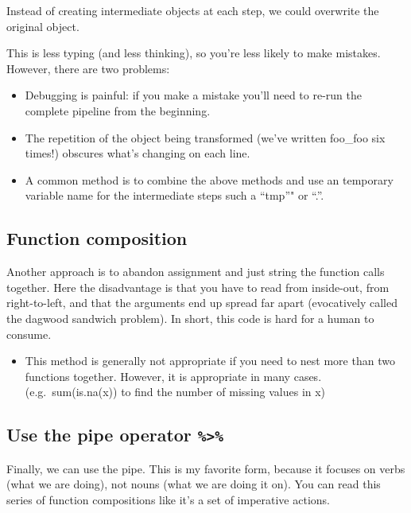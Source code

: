 \documentclass[]{book}
\providecommand{\tightlist}{%
  \setlength{\itemsep}{0pt}\setlength{\parskip}{0pt}}
\newenvironment{rmdblock}[1]
  {\begin{shaded*}
  \begin{itemize}
  \renewcommand{\labelitemi}{
    \raisebox{-.7\height}[0pt][0pt]{
      {\setkeys{Gin}{width=3em,keepaspectratio}\texttt{[image: images/\#1]}}
    }
  }
  \item
  }
  {
  \end{itemize}
  \end{shaded*}
  }
\newenvironment{rmdnote}
  {\begin{rmdblock}{note}}
  {\end{rmdblock}}
\theoremstyle{definition}
\theoremstyle{definition}
\theoremstyle{definition}
\theoremstyle{remark}
\begin{document}
Instead of creating intermediate objects at each step, we could
overwrite the original object.

This is less typing (and less thinking), so you're less likely to make
mistakes. However, there are two problems:

\begin{itemize}
\tightlist
\item
  Debugging is painful: if you make a mistake you'll need to re-run the
  complete pipeline from the beginning.
\item
  The repetition of the object being transformed (we've written foo\_foo
  six times!) obscures what's changing on each line.
\end{itemize}

\begin{rmdnote}
A common method is to combine the above methods and use an temporary
variable name for the intermediate steps such a ``tmp''" or ``.''.
\end{rmdnote}

\hypertarget{function-composition}{%
\subsection{Function composition}\label{function-composition}}

Another approach is to abandon assignment and just string the function
calls together. Here the disadvantage is that you have to read from
inside-out, from right-to-left, and that the arguments end up spread far
apart (evocatively called the dagwood sandwich problem). In short, this
code is hard for a human to consume.

\begin{rmdnote}
This method is generally not appropriate if you need to nest more than
two functions together. However, it is appropriate in many cases.
(e.g.~sum(is.na(x)) to find the number of missing values in x)
\end{rmdnote}

\hypertarget{use-the-pipe-operator}{%
\subsection{\texorpdfstring{Use the pipe operator
\texttt{\%\textgreater{}\%}}{Use the pipe operator \%\textgreater{}\%}}\label{use-the-pipe-operator}}

Finally, we can use the pipe. This is my favorite form, because it
focuses on verbs (what we are doing), not nouns (what we are doing it
on). You can read this series of function compositions like it's a set
of imperative actions.
\end{document}
